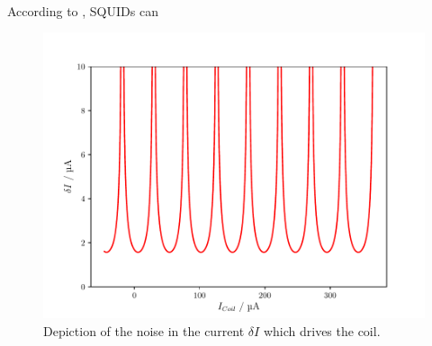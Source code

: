 \documentclass[a4paper,10pt]{article}
\begin{document}
\\
According to \cite{hyperphysics}, SQUIDs can %
\begin{figure}[htp!]
    \centering
    \includegraphics[width = 0.6 \textwidth]{noise.pdf}
    \caption{Depiction of the noise in the current $\delta I$ which drives the coil. }
    \label{fig_noise}
\end{figure}
\end{document}
